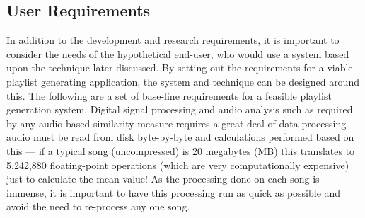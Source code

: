 \subsection{User Requirements}
In addition to the development and research requirements, it is important to consider the needs of the hypothetical end-user, who would use a system based upon the technique later discussed. By setting out the requirements for a viable playlist generating application, the system and technique can be designed around this. The following are a set of base-line requirements for a feasible playlist generation system.
Digital signal processing and audio analysis such as required by any audio-based similarity measure requires a great deal of data processing --- audio must be read from disk byte-by-byte and calculations performed based on this --- if a typical song (uncompressed) is 20 megabytes (MB) this translates to 5,242,880 floating-point operations (which are very computationally expensive) just to calculate the mean value! As the processing done on each song is immense, it is important to have this processing run as quick as possible and avoid the need to re-process any one song.

